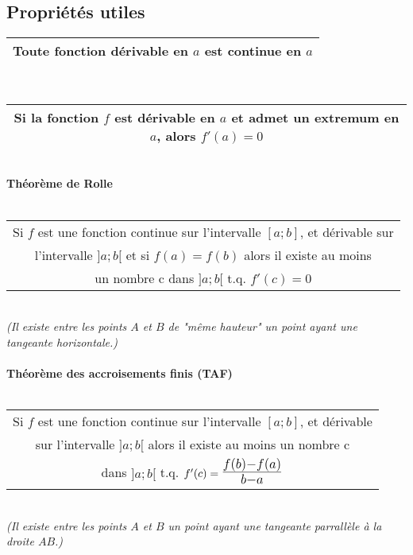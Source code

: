 \documentclass[12pt, a4paper]{book}
\def\mathLarge#1{\mbox{\LARGE $#1$}}
\begin{document}
\subsection{Propriétés utiles}
    \begin{tabular}{ |c|}
        \hline
        Toute fonction dérivable en $a$ est continue en $a$\\
        \hline
    \end{tabular}
    \newline \\
    \begin{tabular}{ |c|}
        \hline
        Si la fonction $f$ est dérivable en $a$ et admet un extremum en $a$, alors $f'(a) = 0$\\
        \hline
    \end{tabular}
    \newline \\
\textbf{Théorème de Rolle}\\
\newline \\
\begin{tabular}{ |c|}
    \hline
    Si $f$ est une fonction continue sur l'intervalle $[a;b]$, et dérivable sur\\
     l'intervalle $]a;b[$ et si $f(a) = f(b)$ alors il existe au moins\\
    un nombre c dans $]a;b[$ t.q. $f'(c)=0$\\
    \hline
\end{tabular}
\newline \\
\textit{(Il existe entre les points $A$ et $B$ de "même hauteur" un point ayant une tangeante horizontale.)}\\
\newline \\
\textbf{Théorème des accroisements finis (TAF)}\\
\newline \\
\begin{tabular}{ |c|}
    \hline
    Si $f$ est une fonction continue sur l'intervalle $[a;b]$, et dérivable \\
    sur l'intervalle $]a;b[$ alors il existe au moins un nombre c \\
    dans $]a;b[$ t.q. $f'(c)= \mathLarge{\frac{f(b)-f(a)}{b-a}}$\\
    \hline
\end{tabular}
\newline \\
\textit{(Il existe entre les points $A$ et $B$ un point ayant une tangeante parrallèle à la droite $AB$.)}
\newpage
\end{document}
